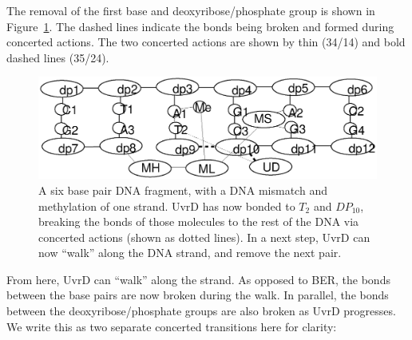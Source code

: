 The removal of the first base and deoxyribose/phosphate group is shown in Figure~\ref{fig:state3}. The dashed lines indicate the bonds being broken and formed during concerted actions. The two concerted actions are shown by thin (34/14) and bold dashed lines (35/24).

\begin{figure}[h!]
  \centering
    \includegraphics[width=1.0\textwidth]{mmr/state3}
  \caption[A six base pair DNA fragment.]{A six base pair DNA fragment, with a DNA mismatch and methylation of one strand. UvrD has now bonded to $T_2$ and $DP_{10}$, breaking the bonds of those molecules to the rest of the DNA via concerted actions (shown as dotted lines). In a next step, UvrD can now ``walk'' along the DNA strand, and remove the next pair.}
  \label{fig:state3}
\end{figure}

From here, UvrD can ``walk'' along the strand. As opposed to BER, the bonds between the base pairs are now broken during the walk. In parallel, the bonds between the deoxyribose/phosphate groups are also broken as UvrD progresses. We write this as two separate concerted transitions here for clarity:


